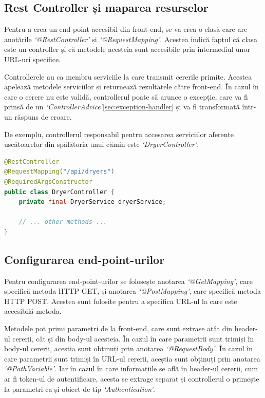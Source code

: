 \documentclass[12pt,a4paper]{report}
\theoremstyle{definition}
\theoremstyle{remark}
\begin{document}
\subsection{Rest Controller și maparea resurselor}

\par Pentru a crea un end-point accesibil din front-end, se va crea o clasă care are anotările \textit{`@RestController'} și \textit{`@RequestMapping'}\cite{burke2009restful}. Acestea indică faptul că clasa este un controller și că metodele acesteia sunt accesibile prin intermediul unor URL-uri specifice.

\par Controllerele au ca membru serviciile la care transmit cererile primite. Acestea apelează metodele serviciilor și returnează rezultatele către front-end. În cazul în care o cerere nu este validă, controllerul poate să arunce o excepție, care va fi prinsă de un \textit{`ControllerAdvice'}\ref{sec:exception-handler} și va fi transformată într-un răspuns de eroare.

\par De exemplu, controllerul responsabil pentru accesarea serviciilor aferente \textnormal{us\-că\-toa\-re\-lor} din spălătoria unui cămin este \textit{`DryerController'}.

\begin{lstlisting}[language=Java, caption={Clasa DryerController}]
@RestController
@RequestMapping("/api/dryers")
@RequiredArgsConstructor
public class DryerController {
    private final DryerService dryerService;

    // ... other methods ...
}
\end{lstlisting}

\subsection{Configurarea end-point-urilor}

\par Pentru configurarea end-point-urilor se folosește anotarea \textit{`@GetMapping'}, care specifică metoda HTTP GET, și anotarea \textit{`@PostMapping'}, care specifică metoda HTTP POST\cite{varanasi2015spring}. Acestea sunt folosite pentru a specifica URL-ul la care este accesibilă metoda.

\par Metodele pot primi parametri de la front-end, care sunt extrase atât din header-ul cererii, cât și din body-ul acesteia. În cazul în care parametrii sunt trimiși în body-ul cererii, aceștia sunt obținuți prin anotarea \textit{`@RequestBody'}. În cazul în care parametrii sunt trimiși în URL-ul cererii, aceștia sunt obținuți prin anotarea \textit{`@PathVariable'}. Iar în cazul în care informațiile se află în header-ul cererii, cum ar fi token-ul de autentificare, acesta se extrage separat și controllerul o primește la parametri ca și obiect de tip \textit{`Authentication'}.
\end{document}
